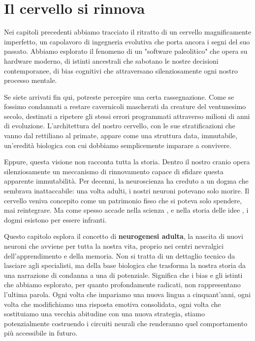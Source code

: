 \chapter{Il cervello si rinnova}

Nei capitoli precedenti abbiamo tracciato il ritratto di un cervello magnificamente imperfetto, un capolavoro di ingegneria evolutiva che porta ancora i segni del suo passato. Abbiamo esplorato il fenomeno di un "software paleolitico" che opera su hardware moderno, di istinti ancestrali che sabotano le nostre decisioni contemporanee, di bias cognitivi che attraversano silenziosamente ogni nostro processo mentale.

Se siete arrivati fin qui, potreste percepire una certa rassegnazione. Come se fossimo condannati a restare cavernicoli mascherati da creature del ventunesimo secolo, destinati a ripetere gli stessi errori programmati attraverso milioni di anni di evoluzione. L'architettura del nostro cervello, con le sue stratificazioni che vanno dal rettiliano al primate, appare come una struttura data, immutabile, un'eredità biologica con cui dobbiamo semplicemente imparare a convivere.

Eppure, questa visione non racconta tutta la storia. Dentro il nostro cranio opera silenziosamente un meccanismo di rinnovamento capace di sfidare questa apparente immutabilità. Per decenni, la neuroscienza ha creduto a un dogma che sembrava inattaccabile: una volta adulti, i nostri neuroni potevano solo morire. Il cervello veniva concepito come un patrimonio fisso che si poteva solo spendere, mai reintegrare. Ma come spesso accade nella scienza , e nella storia delle idee , i dogmi esistono per essere infranti.

Questo capitolo esplora il concetto di \textbf{neurogenesi adulta}, la nascita di nuovi neuroni che avviene per tutta la nostra vita, proprio nei centri nevralgici dell'apprendimento e della memoria. Non si tratta di un dettaglio tecnico da lasciare agli specialisti, ma della base biologica che trasforma la nostra storia da una narrazione di condanna a una di potenziale. Significa che i bias e gli istinti che abbiamo esplorato, per quanto profondamente radicati, non rappresentano l'ultima parola. Ogni volta che impariamo una nuova lingua a cinquant'anni, ogni volta che modifichiamo una risposta emotiva consolidata, ogni volta che sostituiamo una vecchia abitudine con una nuova strategia, stiamo potenzialmente costruendo i circuiti neurali che renderanno quel comportamento più accessibile in futuro.

